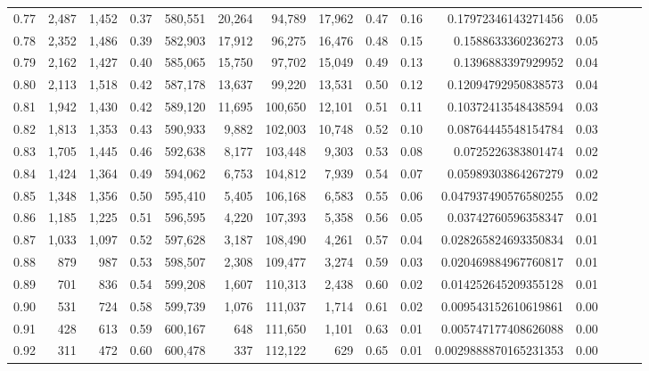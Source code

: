 \begin{tabular}{rrrrrrrrrrrrrrr}
0.77 &   2,487 &  1,452 &  0.37 &  580,551 &   20,264 &   94,789 &   17,962 &  0.47 &  0.16 &    0.17972346143271456 &      0.05 \\
0.78 &   2,352 &  1,486 &  0.39 &  582,903 &   17,912 &   96,275 &   16,476 &  0.48 &  0.15 &     0.1588633360236273 &      0.05 \\
0.79 &   2,162 &  1,427 &  0.40 &  585,065 &   15,750 &   97,702 &   15,049 &  0.49 &  0.13 &     0.1396883397929952 &      0.04 \\
0.80 &   2,113 &  1,518 &  0.42 &  587,178 &   13,637 &   99,220 &   13,531 &  0.50 &  0.12 &    0.12094792950838573 &      0.04 \\
0.81 &   1,942 &  1,430 &  0.42 &  589,120 &   11,695 &  100,650 &   12,101 &  0.51 &  0.11 &    0.10372413548438594 &      0.03 \\
0.82 &   1,813 &  1,353 &  0.43 &  590,933 &    9,882 &  102,003 &   10,748 &  0.52 &  0.10 &    0.08764445548154784 &      0.03 \\
0.83 &   1,705 &  1,445 &  0.46 &  592,638 &    8,177 &  103,448 &    9,303 &  0.53 &  0.08 &     0.0725226383801474 &      0.02 \\
0.84 &   1,424 &  1,364 &  0.49 &  594,062 &    6,753 &  104,812 &    7,939 &  0.54 &  0.07 &    0.05989303864267279 &      0.02 \\
0.85 &   1,348 &  1,356 &  0.50 &  595,410 &    5,405 &  106,168 &    6,583 &  0.55 &  0.06 &   0.047937490576580255 &      0.02 \\
0.86 &   1,185 &  1,225 &  0.51 &  596,595 &    4,220 &  107,393 &    5,358 &  0.56 &  0.05 &    0.03742760596358347 &      0.01 \\
0.87 &   1,033 &  1,097 &  0.52 &  597,628 &    3,187 &  108,490 &    4,261 &  0.57 &  0.04 &   0.028265824693350834 &      0.01 \\
0.88 &     879 &    987 &  0.53 &  598,507 &    2,308 &  109,477 &    3,274 &  0.59 &  0.03 &   0.020469884967760817 &      0.01 \\
0.89 &     701 &    836 &  0.54 &  599,208 &    1,607 &  110,313 &    2,438 &  0.60 &  0.02 &   0.014252645209355128 &      0.01 \\
0.90 &     531 &    724 &  0.58 &  599,739 &    1,076 &  111,037 &    1,714 &  0.61 &  0.02 &   0.009543152610619861 &      0.00 \\
0.91 &     428 &    613 &  0.59 &  600,167 &      648 &  111,650 &    1,101 &  0.63 &  0.01 &   0.005747177408626088 &      0.00 \\
0.92 &     311 &    472 &  0.60 &  600,478 &      337 &  112,122 &      629 &  0.65 &  0.01 &  0.0029888870165231353 &      0.00 \\

\end{tabular}
